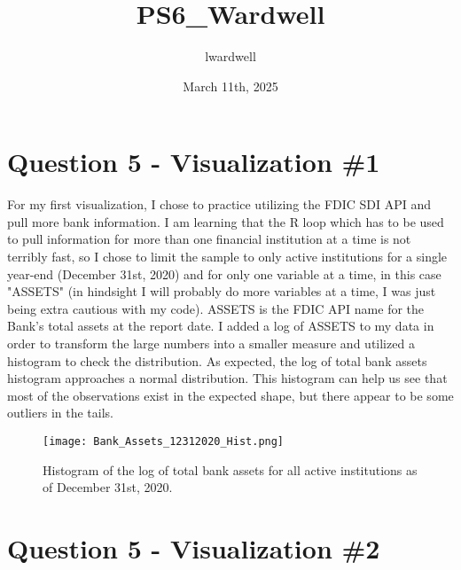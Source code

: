 \documentclass{article}
\title{PS6\_Wardwell}
\author{lwardwell }
\date{March 11th, 2025}
\begin{document}
\maketitle

\section{Question 5 - Visualization \#1}

For my first visualization, I chose to practice utilizing the FDIC SDI API and pull more bank information. I am learning that the R loop which has to be used to pull information for more than one financial institution at a time is not terribly fast, so I chose to limit the sample to only active institutions for a single year-end (December 31st, 2020) and for only one variable at a time, in this case "ASSETS" (in hindsight I will probably do more variables at a time, I was just being extra cautious with my code). ASSETS is the FDIC API name for the Bank's total assets at the report date. I added a log of ASSETS to my data in order to transform the large numbers into a smaller measure and utilized a histogram to check the distribution. As expected, the log of total bank assets histogram approaches a normal distribution. This histogram can help us see that most of the observations exist in the expected shape, but there appear to be some outliers in the tails.   

\begin{figure}[H]
    \centering
    \texttt{[image: Bank\_Assets\_12312020\_Hist.png]}  %
    \caption{Histogram of the log of total bank assets for all active institutions as of December 31st, 2020.}
    \label{fig:your-label}
\end{figure}
\newpage

\section{Question 5 - Visualization \#2}
\end{document}
